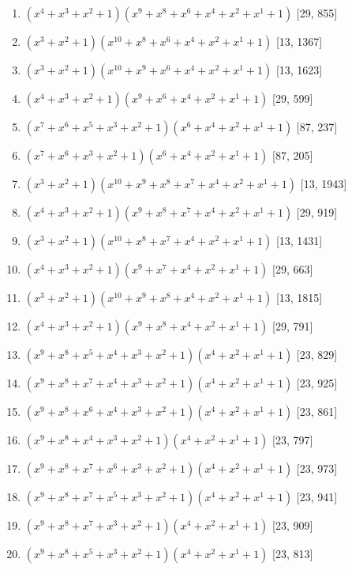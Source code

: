 \documentclass[10pt,twocolumn]{article}
\begin{document}
\begin{enumerate}
\item $(x^{4} + x^{3} + x^{2} + 1)(x^{9} + x^{8} + x^{6} + x^{4} + x^{2} + x^{1} + 1)$  [29, 855]
\item $(x^{3} + x^{2} + 1)(x^{10} + x^{8} + x^{6} + x^{4} + x^{2} + x^{1} + 1)$  [13, 1367]
\item $(x^{3} + x^{2} + 1)(x^{10} + x^{9} + x^{6} + x^{4} + x^{2} + x^{1} + 1)$  [13, 1623]
\item $(x^{4} + x^{3} + x^{2} + 1)(x^{9} + x^{6} + x^{4} + x^{2} + x^{1} + 1)$  [29, 599]
\item $(x^{7} + x^{6} + x^{5} + x^{3} + x^{2} + 1)(x^{6} + x^{4} + x^{2} + x^{1} + 1)$  [87, 237]
\item $(x^{7} + x^{6} + x^{3} + x^{2} + 1)(x^{6} + x^{4} + x^{2} + x^{1} + 1)$  [87, 205]
\item $(x^{3} + x^{2} + 1)(x^{10} + x^{9} + x^{8} + x^{7} + x^{4} + x^{2} + x^{1} + 1)$  [13, 1943]
\item $(x^{4} + x^{3} + x^{2} + 1)(x^{9} + x^{8} + x^{7} + x^{4} + x^{2} + x^{1} + 1)$  [29, 919]
\item $(x^{3} + x^{2} + 1)(x^{10} + x^{8} + x^{7} + x^{4} + x^{2} + x^{1} + 1)$  [13, 1431]
\item $(x^{4} + x^{3} + x^{2} + 1)(x^{9} + x^{7} + x^{4} + x^{2} + x^{1} + 1)$  [29, 663]
\item $(x^{3} + x^{2} + 1)(x^{10} + x^{9} + x^{8} + x^{4} + x^{2} + x^{1} + 1)$  [13, 1815]
\item $(x^{4} + x^{3} + x^{2} + 1)(x^{9} + x^{8} + x^{4} + x^{2} + x^{1} + 1)$  [29, 791]
\item $(x^{9} + x^{8} + x^{5} + x^{4} + x^{3} + x^{2} + 1)(x^{4} + x^{2} + x^{1} + 1)$  [23, 829]
\item $(x^{9} + x^{8} + x^{7} + x^{4} + x^{3} + x^{2} + 1)(x^{4} + x^{2} + x^{1} + 1)$  [23, 925]
\item $(x^{9} + x^{8} + x^{6} + x^{4} + x^{3} + x^{2} + 1)(x^{4} + x^{2} + x^{1} + 1)$  [23, 861]
\item $(x^{9} + x^{8} + x^{4} + x^{3} + x^{2} + 1)(x^{4} + x^{2} + x^{1} + 1)$  [23, 797]
\item $(x^{9} + x^{8} + x^{7} + x^{6} + x^{3} + x^{2} + 1)(x^{4} + x^{2} + x^{1} + 1)$  [23, 973]
\item $(x^{9} + x^{8} + x^{7} + x^{5} + x^{3} + x^{2} + 1)(x^{4} + x^{2} + x^{1} + 1)$  [23, 941]
\item $(x^{9} + x^{8} + x^{7} + x^{3} + x^{2} + 1)(x^{4} + x^{2} + x^{1} + 1)$  [23, 909]
\item $(x^{9} + x^{8} + x^{5} + x^{3} + x^{2} + 1)(x^{4} + x^{2} + x^{1} + 1)$  [23, 813]

\end{enumerate}
\end{document}
